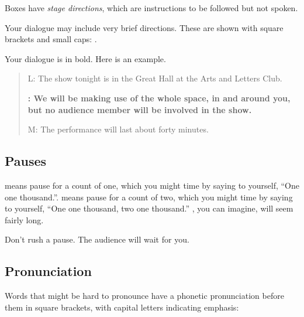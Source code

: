 Boxes have \textit{stage directions}, which are instructions to be followed but not spoken.


\vspace{0.5\baselineskip}
\vspace{0.5\baselineskip}



Your dialogue may include very brief directions.  These are shown with square brackets and small caps: .

Your dialogue is in bold.  Here is an example.

\begin{quote}

L:  The show tonight is in the Great Hall at the Arts and Letters Club.

\textbf{\performerletter{\speaker}:   We will be making use of the whole space, in and around you, but no audience member will be involved in the show.}

M:  The performance will last about forty minutes.

\end{quote}

\subsection*{Pauses}

 means pause for a count of one, which you might time by saying to yourself, ``One one thousand.''.   means pause for a count of two, which you might time by saying to yourself, ``One one thousand, two one thousand.''  , you can imagine, will seem fairly long.

Don't rush a pause.  The audience will wait for you.

\subsection*{Pronunciation}

Words that might be hard to pronounce have a phonetic pronunciation before them in square brackets, with capital letters indicating emphasis:

